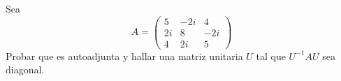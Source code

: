\item Sea \[A=\begin{pmatrix}
        5&-2i&4\\2i&8&-2i\\4&2i&5
    \end{pmatrix}\]
    Probar que es autoadjunta y hallar una matriz unitaria $U$ tal que $U^{-1}AU$ sea diagonal.
    \begin{mdframed}[style=s]
        
    \end{mdframed}